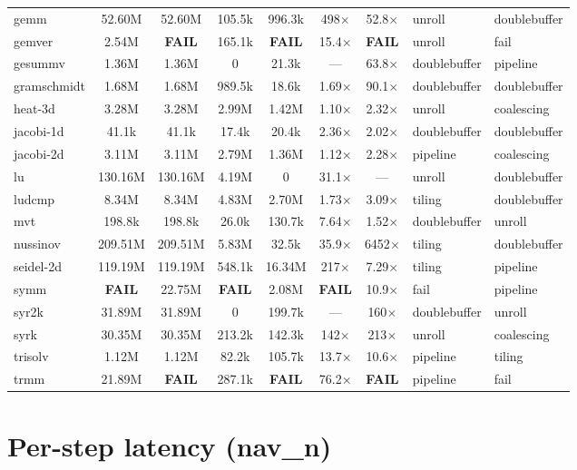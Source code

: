 \documentclass[11pt]{article}
\begin{document}
\begin{longtable}{@{}l cc cc cc L{1.6cm} L{1.6cm}@{}}
gemm & 52.60M & 52.60M & 105.5k & 996.3k & 498$\times$ & 52.8$\times$ & unroll & doublebuffer \\
gemver & 2.54M & \textbf{FAIL} & 165.1k & \textbf{FAIL} & 15.4$\times$ & \textbf{FAIL} & unroll & fail \\
gesummv & 1.36M & 1.36M & 0 & 21.3k & --- & 63.8$\times$ & doublebuffer & pipeline \\
gramschmidt & 1.68M & 1.68M & 989.5k & 18.6k & 1.69$\times$ & 90.1$\times$ & doublebuffer & doublebuffer \\
heat-3d & 3.28M & 3.28M & 2.99M & 1.42M & 1.10$\times$ & 2.32$\times$ & unroll & coalescing \\
jacobi-1d & 41.1k & 41.1k & 17.4k & 20.4k & 2.36$\times$ & 2.02$\times$ & doublebuffer & doublebuffer \\
jacobi-2d & 3.11M & 3.11M & 2.79M & 1.36M & 1.12$\times$ & 2.28$\times$ & pipeline & coalescing \\
lu & 130.16M & 130.16M & 4.19M & 0 & 31.1$\times$ & --- & unroll & doublebuffer \\
ludcmp & 8.34M & 8.34M & 4.83M & 2.70M & 1.73$\times$ & 3.09$\times$ & tiling & doublebuffer \\
mvt & 198.8k & 198.8k & 26.0k & 130.7k & 7.64$\times$ & 1.52$\times$ & doublebuffer & unroll \\
nussinov & 209.51M & 209.51M & 5.83M & 32.5k & 35.9$\times$ & 6452$\times$ & tiling & doublebuffer \\
seidel-2d & 119.19M & 119.19M & 548.1k & 16.34M & 217$\times$ & 7.29$\times$ & tiling & pipeline \\
symm & \textbf{FAIL} & 22.75M & \textbf{FAIL} & 2.08M & \textbf{FAIL} & 10.9$\times$ & fail & pipeline \\
syr2k & 31.89M & 31.89M & 0 & 199.7k & --- & 160$\times$ & doublebuffer & unroll \\
syrk & 30.35M & 30.35M & 213.2k & 142.3k & 142$\times$ & 213$\times$ & unroll & coalescing \\
trisolv & 1.12M & 1.12M & 82.2k & 105.7k & 13.7$\times$ & 10.6$\times$ & pipeline & tiling \\
trmm & 21.89M & \textbf{FAIL} & 287.1k & \textbf{FAIL} & 76.2$\times$ & \textbf{FAIL} & pipeline & fail \\
\end{longtable}
\normalsize

\section{Per-step latency (nav\_n)}
\end{document}
